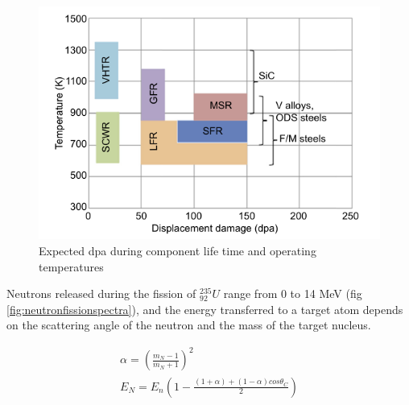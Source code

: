 \begin{figure}[h]
  \begin{center}
    \includegraphics[scale=0.60]{chapters/austenitic_steels_in_nuclear/images/dpagenIV.png}
    \caption{Expected \acrshort{dpa} during component life time and operating temperatures\cite{genIVstrucmat}}
    \label{fig:genIVdpa}
  \end{center}
\end{figure}
\FloatBarrier

Neutrons released during the fission of ${}^{235}_{92}U$ range from 0 to 14 MeV (fig \ref{fig:neutronfissionspectra}), and the energy transferred to a target atom depends on the scattering angle of the neutron and the mass of the target nucleus.  

\begin{equation}
\begin{split}
\alpha = (\frac{m_N-1}{m_N+1})^2 \\
E_N = E_n \left(1 - \frac{(1+\alpha) + (1 - \alpha) cos \theta_C}{2}\right)
\end{split}
\label{eq:eqNeutronEnergyTransfer}
\end{equation}

